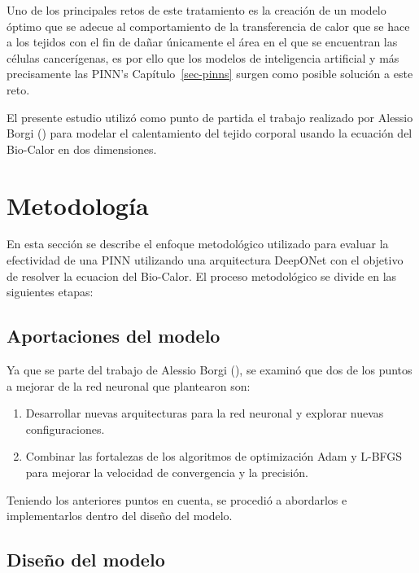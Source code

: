 \documentclass[
  spanish,
  us-letterpaper,
  DIV=11,
  numbers=noendperiod]{scrreprt}
\providecommand{\tightlist}{%
  \setlength{\itemsep}{0pt}\setlength{\parskip}{0pt}}
\theoremstyle{plain}
\theoremstyle{definition}
\theoremstyle{remark}
\begin{document}
Uno de los principales retos de este tratamiento es la creación de un
modelo óptimo que se adecue al comportamiento de la transferencia de
calor que se hace a los tejidos con el fin de dañar únicamente el área
en el que se encuentran las células cancerígenas, es por ello que los
modelos de inteligencia artificial y más precisamente las PINN's
Capítulo~\ref{sec-pinns} surgen como posible solución a este reto.

El presente estudio utilizó como punto de partida el trabajo realizado
por Alessio Borgi () para modelar el
calentamiento del tejido corporal usando la ecuación del Bio-Calor en
dos dimensiones.

\chapter{Metodología}\label{metodologuxeda}

En esta sección se describe el enfoque metodológico utilizado para
evaluar la efectividad de una PINN utilizando una arquitectura DeepONet
con el objetivo de resolver la ecuacion del Bio-Calor. El proceso
metodológico se divide en las siguientes etapas:

\section{Aportaciones del modelo}\label{aportaciones-del-modelo}

Ya que se parte del trabajo de Alessio Borgi
(), se examinó que dos de los puntos a
mejorar de la red neuronal que plantearon son:

\begin{enumerate}
\def\labelenumi{\arabic{enumi}.}
\tightlist
\item
  Desarrollar nuevas arquitecturas para la red neuronal y explorar
  nuevas configuraciones.
\item
  Combinar las fortalezas de los algoritmos de optimización Adam y
  L-BFGS para mejorar la velocidad de convergencia y la precisión.
\end{enumerate}

Teniendo los anteriores puntos en cuenta, se procedió a abordarlos e
implementarlos dentro del diseño del modelo.

\section{Diseño del modelo}\label{diseuxf1o-del-modelo}
\end{document}
